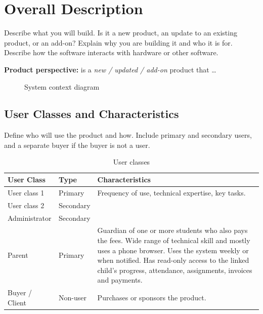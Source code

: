 \chapter{Overall Description}\label{ch:overall}
\begin{guidance}
Describe what you will build. Is it a new product, an update to an existing product, or an add-on? Explain why you are building it and who it is for. Describe how the software interacts with hardware or other software.
\end{guidance}

\textbf{Product perspective:} \theproject{} is a \emph{new / updated / add-on} product that \ldots

\begin{figure}[H]
  \centering
  \caption{System context diagram}\label{fig:context}
\end{figure}

\section{User Classes and Characteristics}\label{sec:userclasses}
\begin{guidance}
Define who will use the product and how. Include primary and secondary users, and a separate buyer if the buyer is not a user.
\end{guidance}

\begin{table}[H]
\centering
\caption{User classes}\label{tab:userclasses}
\begin{tabularx}{\textwidth}{|L{3cm}|L{2.2cm}|X|}
\hline
{}\sffamily\bfseries User Class & \sffamily\bfseries Type & \sffamily\bfseries Characteristics \\ \hline
User class 1 & Primary   & Frequency of use, technical expertise, key tasks. \\ \hline
User class 2 & Secondary & \\ \hline
Administrator & Secondary & \\ \hline
Parent & Primary & Guardian of one or more students who also pays the fees. Wide range of technical skill and mostly uses a phone browser. Uses the system weekly or when notified. Has read-only access to the linked child's progress, attendance, assignments, invoices and payments. \\ \hline
Buyer / Client & Non-user & Purchases or sponsors the product. \\ \hline
\end{tabularx}
\end{table}

